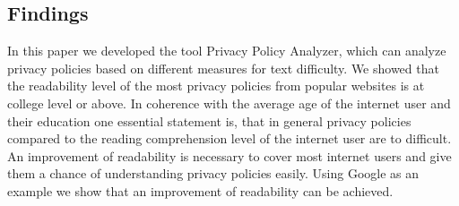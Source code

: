 \documentclass[runningheads,a4paper]{llncs}
\begin{document}
\subsection{Findings} 

In this paper we developed the tool Privacy Policy Analyzer, which can analyze privacy policies based on different measures for text difficulty.
We showed that the readability level of the most privacy policies from popular websites is at college level or above. In coherence with the average age of the internet user and their education one essential statement is, that in general privacy policies compared to the reading comprehension level of the internet user are to difficult. An improvement of readability is necessary to cover most internet users and give them a chance of understanding privacy policies easily. Using Google as an example we show that an improvement of readability can be achieved.


\end{document}
